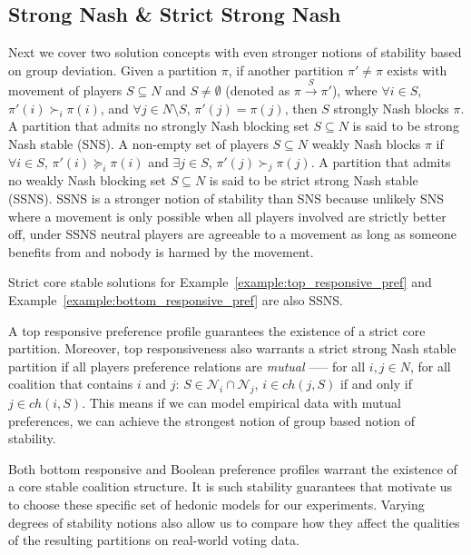 \subsection{Strong Nash \& Strict Strong Nash}
\label{subsec:strong_nash_strict_strong_nash}
Next we cover two solution concepts with even stronger notions of stability
based on group deviation.
Given a partition $\pi$, if another partition $\pi' \neq \pi$ exists with
movement of players $S \subseteq N$ and $S \neq \emptyset$ (denoted as
$\pi \xrightarrow{S} \pi'$), where $\forall i \in S$, $\pi'(i) \succ_i \pi(i)$,
and $\forall j \in N\text{\textbackslash}S$, $\pi'(j) = \pi(j)$,
then $S$ strongly Nash blocks $\pi$.
A partition that admits no strongly Nash blocking set $S \subseteq N$ is said
to be strong Nash stable (SNS).
A non-empty set of players $S \subseteq N$ weakly Nash blocks $\pi$ if
$\forall i \in S$, $\pi'(i) \succeq_i \pi(i)$ and $\exists j \in S$,
$\pi'(j) \succ_j \pi(j)$.
A partition that admits no weakly Nash blocking set $S \subseteq N$ is said to
be strict strong Nash stable (SSNS).
SSNS is a stronger notion of stability than SNS because unlikely SNS where a
movement is only possible when all players involved are strictly better off,
under SSNS neutral players are agreeable to a movement as long as someone benefits
from and nobody is harmed by the movement.

Strict core stable solutions for Example~\ref{example:top_responsive_pref}
and Example~\ref{example:bottom_responsive_pref} are also SSNS.

A top responsive preference profile guarantees the existence of a strict core partition.
Moreover, top responsiveness also warrants a strict strong Nash stable partition
if all players preference relations are \textit{mutual} ––– for all $i, j \in N$,
for all coalition that contains $i$ and $j$:
$S \in \mathcal{N}_i \cap \mathcal{N}_j$, $i \in ch(j, S)$ if and only if
$j \in ch(i, S)$.
This means if we can model empirical data with mutual preferences,
we can achieve the strongest notion of group based notion of stability.

Both bottom responsive and Boolean preference profiles warrant the existence of
a core stable coalition structure.
It is such stability guarantees that motivate us to choose these specific set
of hedonic models for our experiments.
Varying degrees of stability notions also allow us to compare how they affect
the qualities of the resulting partitions on real-world voting data.


